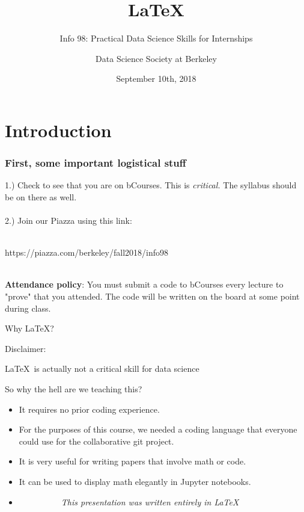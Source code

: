 \documentclass[10pt,xcolor={table,dvipsnames},t]{beamer}
\title[\LaTeX]{\LaTeX}
\subtitle{Info 98: Practical Data Science Skills for Internships}
\author{Data Science Society at Berkeley}
\institute{datasciencedecal@gmail.com}
\date{September 10th, 2018}
\begin{document}
\begin{frame}
  \titlepage
\end{frame}


\section{Introduction}
 
 \begin{frame}
\frametitle{First, some important logistical stuff}
1.) Check to see that you are on bCourses. This is \textit{critical.} The syllabus should be on there as well.\\\\
2.) Join our Piazza using this link:\\\\
\begin{center}
https://piazza.com/berkeley/fall2018/info98 \\\\
\end{center}
\textbf{Attendance policy}: You must submit a code to bCourses every lecture to "prove" that you attended. The code will be written on the board at some point during class.\\

\end{frame}

\begin{frame}{Why \LaTeX ?}

\begin{block}{Disclaimer:}

\LaTeX \ is actually not a critical skill for data science

\end{block}

\begin{block}{So why the hell are we teaching this?}
\begin{itemize}
\item It requires no prior coding experience.
\item For the purposes of this course, we needed a coding language that everyone could use for the collaborative git project.
\item It is very useful for writing papers that involve math or code.
\item It can be used to display math elegantly in Jupyter notebooks.
\item \ \  \ \ \ \ \ \ \ \ \textit{This presentation was written entirely in \LaTeX}

\end{itemize}
\end{block}
\end{frame}
 
\end{document}
